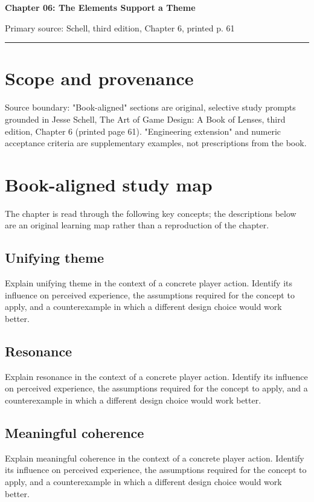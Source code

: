 \documentclass[11pt]{article}
\begin{document}
{\huge\bfseries\color{suiteblue} Chapter 06: The Elements Support a Theme}\par
\vspace{0.15in}
{\normalsize\color{suitegray} Primary source: Schell, third edition, Chapter 6, printed p. 61}\par
\vspace{0.15in}\hrule\vspace{0.15in}

\section{Scope and provenance}
Source boundary: "Book-aligned" sections are original, selective study prompts grounded in Jesse Schell, The Art of Game Design: A Book of Lenses, third edition, Chapter 6 (printed page 61). "Engineering extension" and numeric acceptance criteria are supplementary examples, not prescriptions from the book.


\section{Book-aligned study map}
The chapter is read through the following key concepts; the descriptions below are an original learning map rather than a reproduction of the chapter.


\subsection{Unifying theme}
Explain unifying theme in the context of a concrete player action. Identify its influence on perceived experience, the assumptions required for the concept to apply, and a counterexample in which a different design choice would work better.


\subsection{Resonance}
Explain resonance in the context of a concrete player action. Identify its influence on perceived experience, the assumptions required for the concept to apply, and a counterexample in which a different design choice would work better.


\subsection{Meaningful coherence}
Explain meaningful coherence in the context of a concrete player action. Identify its influence on perceived experience, the assumptions required for the concept to apply, and a counterexample in which a different design choice would work better.
\end{document}
